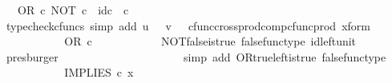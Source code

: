 \begin{isabellebody}
\ {\isachardoublequoteopen}{\isachardot}{\kern0pt}{\isachardot}{\kern0pt}{\isachardot}{\kern0pt}\ {\isacharequal}{\kern0pt}\ OR\ {\isasymcirc}\isactrlsub c\ {\isasymlangle}NOT\ {\isasymcirc}\isactrlsub c\ {\isasymf}{\isacharcomma}{\kern0pt}\ id\isactrlsub c\ {\isasymOmega}\ {\isasymcirc}\isactrlsub c\ {\isasymf}{\isasymrangle}{\isachardoublequoteclose}\isanewline
\ \ \ \ \ \ \ \ \isamarkupfalse%
\ {\isacharparenleft}{\kern0pt}typecheck{\isacharunderscore}{\kern0pt}cfuncs{\isacharcomma}{\kern0pt}\ simp\ add{\isacharcolon}{\kern0pt}\ {\isacartoucheopen}u\ {\isacharequal}{\kern0pt}\ {\isasymf}{\isacartoucheclose}\ {\isacartoucheopen}v\ {\isacharequal}{\kern0pt}\ {\isasymf}{\isacartoucheclose}\ cfunc{\isacharunderscore}{\kern0pt}cross{\isacharunderscore}{\kern0pt}prod{\isacharunderscore}{\kern0pt}comp{\isacharunderscore}{\kern0pt}cfunc{\isacharunderscore}{\kern0pt}prod\ x{\isacharunderscore}{\kern0pt}form{\isacharparenright}{\kern0pt}\isanewline
\ \ \ \ \ \ \isamarkupfalse%
\ \isamarkupfalse%
\ {\isachardoublequoteopen}{\isachardot}{\kern0pt}{\isachardot}{\kern0pt}{\isachardot}{\kern0pt}\ {\isacharequal}{\kern0pt}\ OR\ {\isasymcirc}\isactrlsub c\ {\isasymlangle}{\isasymt}{\isacharcomma}{\kern0pt}\ {\isasymf}{\isasymrangle}{\isachardoublequoteclose}\isanewline
\ \ \ \ \ \ \ \ \isamarkupfalse%
\ NOT{\isacharunderscore}{\kern0pt}false{\isacharunderscore}{\kern0pt}is{\isacharunderscore}{\kern0pt}true\ false{\isacharunderscore}{\kern0pt}func{\isacharunderscore}{\kern0pt}type\ id{\isacharunderscore}{\kern0pt}left{\isacharunderscore}{\kern0pt}unit{}\ \isamarkupfalse%
\ presburger\isanewline
\ \ \ \ \ \ \isamarkupfalse%
\ \isamarkupfalse%
\ {\isachardoublequoteopen}{\isachardot}{\kern0pt}{\isachardot}{\kern0pt}{\isachardot}{\kern0pt}\ {\isacharequal}{\kern0pt}\ {\isasymt}{\isachardoublequoteclose}\isanewline
\ \ \ \ \ \ \ \ \isamarkupfalse%
\ {\isacharparenleft}{\kern0pt}simp\ add{\isacharcolon}{\kern0pt}\ OR{\isacharunderscore}{\kern0pt}true{\isacharunderscore}{\kern0pt}left{\isacharunderscore}{\kern0pt}is{\isacharunderscore}{\kern0pt}true\ false{\isacharunderscore}{\kern0pt}func{\isacharunderscore}{\kern0pt}type{\isacharparenright}{\kern0pt}\isanewline
\ \ \ \ \ \ \isamarkupfalse%
\ \isamarkupfalse%
\ {\isachardoublequoteopen}{\isachardot}{\kern0pt}{\isachardot}{\kern0pt}{\isachardot}{\kern0pt}\ {\isacharequal}{\kern0pt}\ IMPLIES\ {\isasymcirc}\isactrlsub c\ x{\isachardoublequoteclose}\isanewline

\end{isabellebody}
